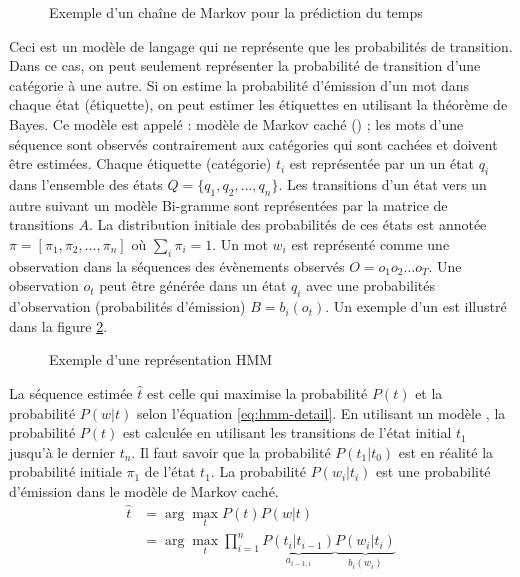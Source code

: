 \documentclass{KodeBook}
\begin{document}
\begin{figure}[ht]
	\centering
	\caption[Exemple d'un chaîne de Markov pour la prédiction du temps]{Exemple d'un chaîne de Markov pour la prédiction du temps \cite{2019-jurafsky-martin}\label{fig:cm-exp}}
\end{figure}

Ceci est un modèle de langage qui ne représente que les probabilités de transition. 
Dans ce cas, on peut seulement représenter la probabilité de transition d'une catégorie à une autre. 
Si on estime la probabilité d'émission d'un mot dans chaque état (étiquette), on peut estimer les étiquettes en utilisant la  théorème de Bayes. 
Ce modèle est appelé : modèle de Markov caché () ; les mots d'une séquence sont observés contrairement aux catégories qui sont cachées et doivent être estimées. 
Chaque étiquette (catégorie) $t_i$ est représentée par un un état $q_i$ dans l'ensemble des états $Q = \{q_1, q_2, \ldots, q_n\}$.
Les transitions d'un état vers un autre suivant un modèle Bi-gramme sont représentées par la matrice de transitions $A$.
La distribution initiale des probabilités de ces états est annotée $\pi = [\pi_1, \pi_2, \ldots, \pi_n ]$ où $\sum_i \pi_i = 1$.
Un mot $w_i$ est représenté comme une observation dans la séquences des évènements observés $O = o_1 o_2 \ldots o_T$. 
Une observation $o_t$ peut être générée dans un état $q_i$ avec une probabilités d'observation (probabilités d'émission) $B = b_i(o_t)$.
Un exemple d'un  est illustré dans la figure \ref{fig:hmm-exp}. 
\begin{figure}[ht]
	\centering
	\caption[Exemple d'une représentation HMM]{Exemple d'une représentation HMM \cite{2019-jurafsky-martin}\label{fig:hmm-exp}}
\end{figure}

La séquence estimée $\hat{t}$ est celle qui maximise la probabilité $P(t)$ et la probabilité $P(w | t)$ selon l'équation \ref{eq:hmm-detail}.
En utilisant un modèle , la probabilité $P(t)$ est calculée en utilisant les transitions de l'état initial $t_1$ jusqu'à le dernier $t_n$. 
Il faut savoir que la probabilité $P(t_1|t_0)$ est en réalité la probabilité initiale $\pi_1$ de l'état $t_1$.
La probabilité $P(w_i | t_i)$ est une probabilité d'émission dans le modèle de Markov caché.
\begin{align}
\hat{t} & = \arg\max\limits_t P(t) P(w | t) \nonumber\\
        & = \arg\max\limits_t \prod_{i=1}^{n} \underbrace{P(t_i|t_{i-1})}_{a_{i-1,i}} \underbrace{P(w_i | t_i)}_{b_i(w_i)} \label{eq:hmm-detail}
\end{align}
\end{document}
